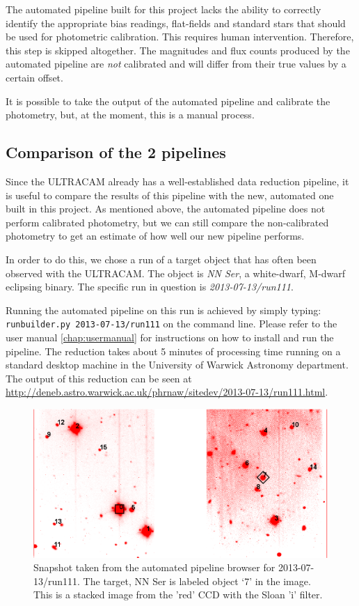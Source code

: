 The automated pipeline built for this project lacks the ability to correctly identify the appropriate bias readings, flat-fields and standard stars that should be used for photometric calibration. This requires human intervention. Therefore, this step is skipped altogether. The magnitudes and flux counts produced by the automated pipeline are \emph{not} calibrated and will differ from their true values by a certain offset.

It is possible to take the output of the automated pipeline and calibrate the photometry, but, at the moment, this is a manual process. 

\subsection{Comparison of the 2 pipelines}
Since the ULTRACAM already has a well-established data reduction pipeline, it is useful to compare the results of this pipeline with the new, automated one built in this project. As mentioned above, the automated pipeline does not perform calibrated photometry, but we can still compare the non-calibrated photometry to get an estimate of how well our new pipeline performs.

In order to do this, we chose a run of a target object that has often been observed with the ULTRACAM. The object is \emph{NN Ser}, a white-dwarf, M-dwarf eclipsing binary. The specific run in question is \emph{2013-07-13/run111}.

Running the automated pipeline on this run is achieved by simply typing: \texttt{runbuilder.py 2013-07-13/run111} on the command line. Please refer to the user manual \ref{chap:usermanual} for instructions on how to install and run the pipeline.  The reduction takes about 5 minutes of processing time running on a standard desktop machine in the University of Warwick Astronomy department. The output of this reduction can be seen at \url{http://deneb.astro.warwick.ac.uk/phrnaw/sitedev/2013-07-13/run111.html}.

\begin{figure}
\centering
\includegraphics[width=120mm]{images/2013-07-13-run111-r-withlabels.png}
\caption{Snapshot taken from the automated pipeline browser for 2013-07-13/run111. The target, {NN Ser} is labeled object `7' in the image. This is a stacked image from the 'red' CCD with the Sloan 'i' filter. }
\label{fig:nnserfield}
\end{figure}

